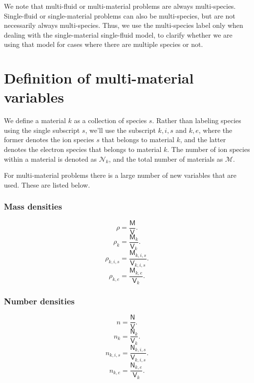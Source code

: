 \documentclass[a4paper,11pt]{report}
\begin{document}
We note that multi-fluid or multi-material problems are always multi-species. Single-fluid or single-material problems can also be multi-species, but are not necessarily always multi-species. Thus, we use the multi-species label only when dealing with the single-material single-fluid model, to clarify whether we are using that model for cases where there are multiple species or not.

\section{Definition of multi-material variables}
We define a material $k$ as a collection of species $s$. Rather than labeling species using the single subscript $s$, we'll use the subscript $k,i,s$ and $k,e$, where the former denotes the ion species $s$ that belongs to material $k$, and the latter denotes the electron species that belongs to material $k$. The number of ion species within a material is denoted as $\mathcal{N}_k$, and the total number of materials as $\mathcal{M}$.

For multi-material problems there is a large number of new variables that are used. These are listed below.
\subsubsection{Mass densities}

\begin{equation}
    \rho = \frac{\mathsf{M}}{\mathsf{V}}.
\end{equation}
\begin{equation}
    \rho_k= \frac{\mathsf{M}_k}{\mathsf{V}_k}.
\end{equation}
\begin{equation}
    \label{eq:mm_mass_den_kis}
    \rho_{k,i,s}= \frac{\mathsf{M}_{k,i,s}}{\mathsf{V}_{k,i,s}}.
\end{equation}
\begin{equation}
    \label{eq:mm_mass_den_ke}
    \rho_{k,e}= \frac{\mathsf{M}_{k,e}}{\mathsf{V}_k}.
\end{equation}

\subsubsection{Number densities}

\begin{equation}
    n = \frac{\mathsf{N}}{\mathsf{V}}.
\end{equation}
\begin{equation}
    n_k = \frac{\mathsf{N}_k}{\mathsf{V}_k}.
\end{equation}
\begin{equation}
    \label{eq:mm_num_den_kis}
    n_{k,i,s} = \frac{\mathsf{N}_{k,i,s}}{\mathsf{V}_{k,i,s}}.
\end{equation}
\begin{equation}
    \label{eq:mm_num_den_ke}
    n_{k,e} = \frac{\mathsf{N}_{k,e}}{\mathsf{V}_k}.
\end{equation}
\end{document}
